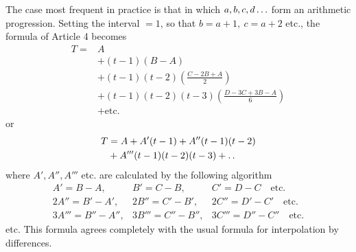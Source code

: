 The case most frequent in practice is that in which \(a,b,c,d\mathinner{.\,.\,.}\) form an arithmetic progression. Setting the interval \(=1\), so that \(b=a+1,\ c=a+2\)
etc., the formula of Article 4 becomes
\[
\begin{aligned}
T={}&A\\
&+(t-1)(B-A)\\
&+(t-1)(t-2)\left(\frac{C-2B+A}{2}\right)\\
&+(t-1)(t-2)(t-3)\left(\frac{D-3C+3B-A}{6}\right)\\
&+\text{etc.}
\end{aligned}
\]
or
\[\begin{aligned}
T&=A+A'(t-1)+A''(t-1)(t-2)\\&+A'''(t-1)(t-2)(t-3)+\mathinner{.\,.}
\end{aligned}\]
where \(A',A'',A'''\) etc. are calculated by the following algorithm
\[
\begin{array}{lll}
A'=B-A,&B'=C-B,&C'=D-C\quad\text{etc.}\\
2A''=B'-A',&2B''=C'-B',&2C''=D'-C'\quad\text{etc.}\\
3A'''=B''-A'',&3B'''=C''-B'',&3C'''=D''-C''\quad\text{etc.}
\end{array}
\]
etc. This formula agrees completely with the usual formula for interpolation by differences.

